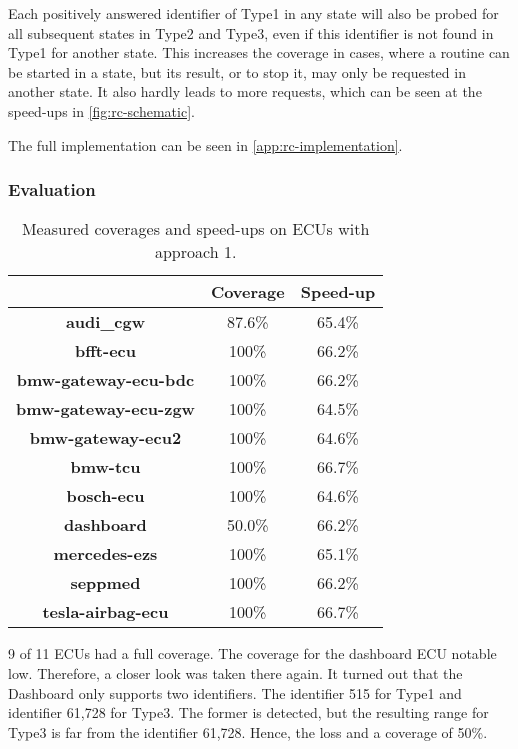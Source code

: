 Each positively answered identifier of Type1 in any state will also be probed for all subsequent states in Type2 and Type3, even if this identifier is not found in Type1 for another state. This increases the coverage in cases, where a routine can be started in a state, but its result, or to stop it, may only be requested in another state. It also hardly leads to more requests, which can be seen at the speed-ups in \autoref{fig:rc-schematic}.

The full implementation can be seen in \autoref{app:rc-implementation}.

\subsubsection{Evaluation}

\begin{table}[h]
    \begin{center}
    \begin{tabular}{ccc}
        \hline
        & \textbf{Coverage} & \textbf{Speed-up} \\
        \hline
        \textbf{audi\_cgw} & 87.6\% & 65.4\% \\
        \textbf{bfft-ecu} & 100\% & 66.2\% \\
        \textbf{bmw-gateway-ecu-bdc} & 100\% & 66.2\% \\
        \textbf{bmw-gateway-ecu-zgw} & 100\% & 64.5\% \\
        \textbf{bmw-gateway-ecu2} & 100\% & 64.6\% \\
        \textbf{bmw-tcu} & 100\% & 66.7\% \\
        \textbf{bosch-ecu} & 100\% & 64.6\% \\
        \textbf{dashboard} & 50.0\% & 66.2\% \\
        \textbf{mercedes-ezs} & 100\% & 65.1\% \\
        \textbf{seppmed} & 100\% & 66.2\% \\
        \textbf{tesla-airbag-ecu} & 100\% & 66.7\% \\
        \hline

    \end{tabular}
    \end{center}
    \caption{Measured coverages and speed-ups on ECUs with approach 1.}
    \label{tab:evaluation-approach1}
\end{table}

9 of 11 ECUs had a full coverage. The coverage for the dashboard ECU notable low. Therefore, a closer look was taken there again. It turned out that the Dashboard only supports two identifiers. The identifier 515 for Type1 and identifier 61,728 for Type3. The former is detected, but the resulting range for Type3 is far from the identifier 61,728. Hence, the loss and a coverage of 50\%.


